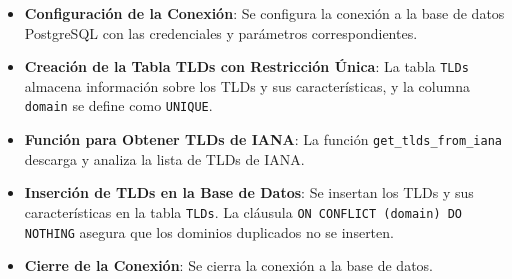 \begin{itemize}
    \item \textbf{Configuración de la Conexión}: Se configura la conexión a la base de datos PostgreSQL con las credenciales y parámetros correspondientes.
    \item \textbf{Creación de la Tabla TLDs con Restricción Única}: La tabla \texttt{TLDs} almacena información sobre los TLDs y sus características, y la columna \texttt{domain} se define como \texttt{UNIQUE}.
    \item \textbf{Función para Obtener TLDs de IANA}: La función \texttt{get\_tlds\_from\_iana} descarga y analiza la lista de TLDs de IANA.
    \item \textbf{Inserción de TLDs en la Base de Datos}: Se insertan los TLDs y sus características en la tabla \texttt{TLDs}. La cláusula \texttt{ON CONFLICT (domain) DO NOTHING} asegura que los dominios duplicados no se inserten.
    \item \textbf{Cierre de la Conexión}: Se cierra la conexión a la base de datos.
\end{itemize}

